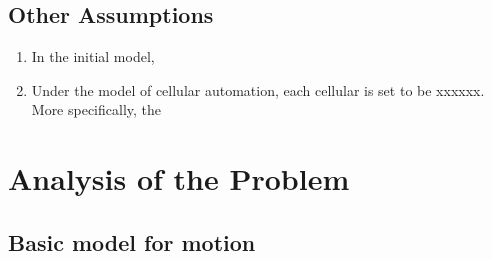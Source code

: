 \documentclass{icmmcm}
\begin{document}
\subsection{Other Assumptions}
\begin{enumerate}
\item In the initial model,
\item Under the model of cellular automation, each cellular is set to be xxxxxx. More specifically, the
\end{enumerate}

\section{Analysis of the Problem}
\subsection{Basic model for motion}
\end{document}
